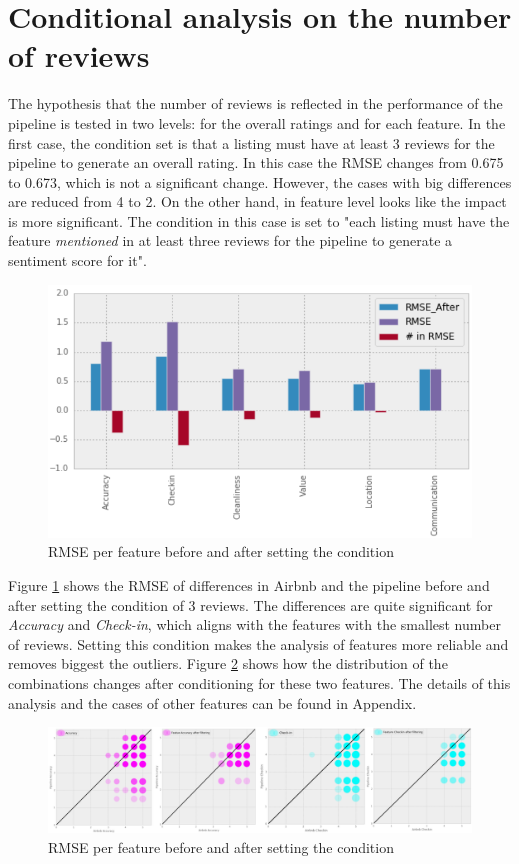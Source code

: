\section{Conditional analysis on the number of reviews}
The hypothesis that the number of reviews is reflected in the performance of the pipeline is tested in two levels: for the overall ratings and for each feature. In the first case, the condition set is that a listing must have at least 3 reviews for the pipeline to generate an overall rating. In this case the RMSE changes from 0.675 to 0.673, which is not a significant change. However, the cases with big differences are reduced from 4 to 2. 
On the other hand, in feature level looks like the impact is more significant. The condition in this case is set to "each listing must have the feature \textit{mentioned} in at least three reviews for the pipeline to generate a sentiment score for it". 
\begin{figure}[h!]
\centering
	\includegraphics[height=0.4\textheight]{RMSE_features}
	\caption{RMSE per feature before and after setting the condition}
	\label{fig:6.6}
\end{figure}
Figure \ref{fig:6.6} shows the RMSE of differences in Airbnb and the pipeline before and after setting the condition of 3 reviews. The differences are quite significant for \textit{Accuracy} and \textit{Check-in}, which aligns with the features with the smallest number of reviews. Setting this condition makes the analysis of features more reliable and removes biggest the outliers. Figure \ref{fig:6.7} shows how the distribution of the combinations changes after conditioning for these two features.  The details of this analysis and the cases of other features can be found in Appendix. 
\begin{figure}[h!]
\centering
	\includegraphics[height=0.19\textheight]{accuracy_checkin}
	\caption{RMSE per feature before and after setting the condition}
	\label{fig:6.7}
\end{figure}


